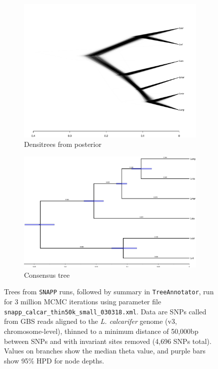 \begin{figure}[htb]
\centering
\begin{subfigure}{.45\textwidth}
  \centering
  \includegraphics[width=.95\linewidth]{figures/densitrees_030318.pdf}
  \caption{Densitrees from posterior}
  \label{fig:030318-densitree}
\end{subfigure}%
\begin{subfigure}{.55\textwidth}
  \centering
  \includegraphics[width=.95\linewidth]{figures/snapp_calcar_thin50k_small_030318_tree.pdf}
  \caption{Consensus tree}
  \label{fig:030318-tree}
\end{subfigure}
\caption{Trees from \texttt{SNAPP} runs, followed by summary in \texttt{TreeAnnotator}, run for 3 million MCMC iterations using parameter file \texttt{snapp\_calcar\_thin50k\_small\_030318.xml}. Data are SNPs called from GBS reads aligned to the \textit{L. calcarifer} genome (v3, chromosome-level), thinned to a minimum distance of 50,000bp between SNPs and with invariant sites removed (4,696 SNPs total). Values on branches show the median theta value, and purple bars show 95\% HPD for node depths.}
\label{fig:tree-annotator-calcar}
\end{figure}


